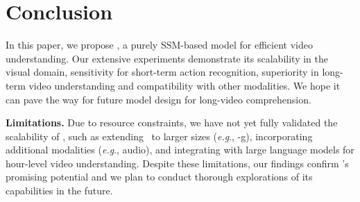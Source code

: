 \section{Conclusion}
\label{sec:conclusion}
In this paper,
we propose \ModelName,
a purely SSM-based model for efficient video understanding.
Our extensive experiments demonstrate its 
scalability in the visual domain, 
sensitivity for short-term action recognition,
superiority in long-term video understanding and compatibility with other modalities. 
We hope it can pave the way for future model design for long-video comprehension.

\vspace{0.05cm}
\noindent\textbf{Limitations.}
Due to resource constraints, 
we have not yet fully validated the scalability of \ModelName, 
such as extending \ModelName\  to larger sizes (\textit{e.g}., \ModelName-g), 
incorporating additional modalities (\textit{e.g}.,  audio), 
and integrating with large language models for hour-level video understanding. 
Despite these limitations, 
our findings confirm \ModelName's promising potential and we plan to conduct thorough explorations of its capabilities in the future.